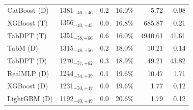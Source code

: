 \begin{tabular}{llccrr}
CatBoost (D) & 1381${}_{-46,+46}$ & 0.2 & 16.0\% & 5.72 & 0.08 \\
XGBoost (T) & 1356${}_{-40,+45}$ & 0.0 & 16.8\% & 685.87 & 0.21 \\
TabDPT (T) & 1351${}_{-58,+66}$ & 0.6 & 16.0\% & 4940.61 & 41.61 \\
TabM (D) & 1315${}_{-48,+56}$ & 0.2 & 18.0\% & 10.21 & 0.14 \\
TabDPT (D) & 1270${}_{-57,+62}$ & 0.3 & 18.9\% & 49.21 & 43.82 \\
RealMLP (D) & 1244${}_{-34,+39}$ & 0.1 & 19.6\% & 10.47 & 1.71 \\
XGBoost (D) & 1231${}_{-50,+47}$ & 0.0 & 19.6\% & 1.77 & 0.12 \\
LightGBM (D) & 1192${}_{-40,+49}$ & 0.0 & 20.6\% & 1.79 & 0.12 \\
\bottomrule
\end{tabular}
